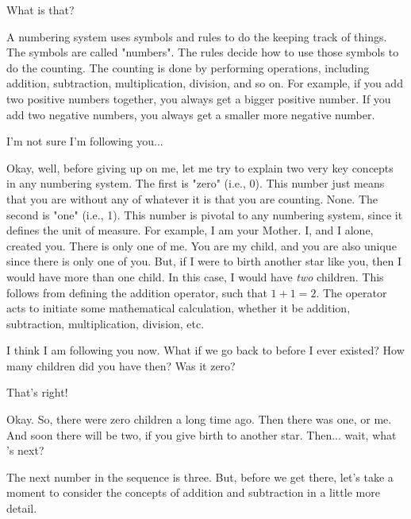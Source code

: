 \documentclass[main.tex]{subfiles}
\begin{document}
\par \Maia What is that?

\par \Pleione A numbering system uses symbols and rules to do the keeping track of things.  The symbols are called "numbers".  The rules decide how to use those symbols to do the counting.  The counting is done by performing operations, including addition, subtraction, multiplication, division, and so on.  For example, if you add two positive numbers together, you always get a bigger positive number.  If you add two negative numbers, you always get a smaller more negative number.  

\par \Maia I'm not sure I'm following you...

\par \Pleione Okay, well, before giving up on me, let me try to explain two very key concepts in any numbering system.  The first is "zero" (i.e., 0).  This number just means that you are without any of whatever it is that you are counting.  None.  The second is "one" (i.e., 1).  This number is pivotal to any numbering system, since it defines the unit of measure.  For example, I am your Mother.  I, and I alone, created you.  There is only one of me.  You are my child, and you are also unique since there is only one of you.  But, if I were to birth another star like you, then I would have more than one child.  In this case, I would have \textit{two} children.  This follows from defining the addition operator, such that $1 + 1 = 2$.  The operator acts to initiate some mathematical calculation, whether it be addition, subtraction, multiplication, division, etc.

\par \Maia I think I am following you now.  What if we go back to before I ever existed?  How many children did you have then?  Was it zero?

\par \Pleione That's right!

\par \Maia Okay.  So, there were zero children a long time ago.  Then there was one, or me.  And soon there will be two, if you give birth to another star.  Then... wait, what 's next?

\par \Pleione The next number in the sequence is three.  But, before we get there, let's take a moment to consider the concepts of addition and subtraction in a little more detail.
\end{document}
